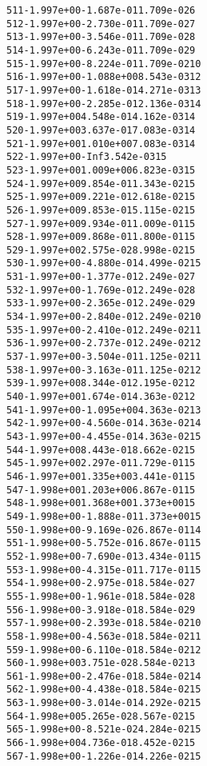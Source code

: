 \begin{alltt}
 511  -1.997e+00  -1.687e-01   1.709e-02    6
 512  -1.997e+00  -2.730e-01   1.709e-02    7
 513  -1.997e+00  -3.546e-01   1.709e-02    8
 514  -1.997e+00  -6.243e-01   1.709e-02    9
 515  -1.997e+00  -8.224e-01   1.709e-02   10
 516  -1.997e+00  -1.088e+00   8.543e-03   12
 517  -1.997e+00  -1.618e-01   4.271e-03   13
 518  -1.997e+00  -2.285e-01   2.136e-03   14
 519  -1.997e+00   4.548e-01   4.162e-03   14
 520  -1.997e+00   3.637e-01   7.083e-03   14
 521  -1.997e+00   1.010e+00   7.083e-03   14
 522  -1.997e+00        -Inf   3.542e-03   15
 523  -1.997e+00   1.009e+00   6.823e-03   15
 524  -1.997e+00   9.854e-01   1.343e-02   15
 525  -1.997e+00   9.221e-01   2.618e-02   15
 526  -1.997e+00   9.853e-01   5.115e-02   15
 527  -1.997e+00   9.934e-01   1.009e-01   15
 528  -1.997e+00   9.868e-01   1.800e-01   15
 529  -1.997e+00   2.575e-02   8.998e-02   15
 530  -1.997e+00  -4.880e-01   4.499e-02   15
 531  -1.997e+00  -1.377e-01   2.249e-02    7
 532  -1.997e+00  -1.769e-01   2.249e-02    8
 533  -1.997e+00  -2.365e-01   2.249e-02    9
 534  -1.997e+00  -2.840e-01   2.249e-02   10
 535  -1.997e+00  -2.410e-01   2.249e-02   11
 536  -1.997e+00  -2.737e-01   2.249e-02   12
 537  -1.997e+00  -3.504e-01   1.125e-02   11
 538  -1.997e+00  -3.163e-01   1.125e-02   12
 539  -1.997e+00   8.344e-01   2.195e-02   12
 540  -1.997e+00   1.674e-01   4.363e-02   12
 541  -1.997e+00  -1.095e+00   4.363e-02   13
 542  -1.997e+00  -4.560e-01   4.363e-02   14
 543  -1.997e+00  -4.455e-01   4.363e-02   15
 544  -1.997e+00   8.443e-01   8.662e-02   15
 545  -1.997e+00   2.297e-01   1.729e-01   15
 546  -1.997e+00   1.335e+00   3.441e-01   15
 547  -1.998e+00   1.203e+00   6.867e-01   15
 548  -1.998e+00   1.368e+00   1.373e+00   15
 549  -1.998e+00  -1.888e-01   1.373e+00   15
 550  -1.998e+00  -9.169e-02   6.867e-01   14
 551  -1.998e+00  -5.752e-01   6.867e-01   15
 552  -1.998e+00  -7.690e-01   3.434e-01   15
 553  -1.998e+00  -4.315e-01   1.717e-01   15
 554  -1.998e+00  -2.975e-01   8.584e-02    7
 555  -1.998e+00  -1.961e-01   8.584e-02    8
 556  -1.998e+00  -3.918e-01   8.584e-02    9
 557  -1.998e+00  -2.393e-01   8.584e-02   10
 558  -1.998e+00  -4.563e-01   8.584e-02   11
 559  -1.998e+00  -6.110e-01   8.584e-02   12
 560  -1.998e+00   3.751e-02   8.584e-02   13
 561  -1.998e+00  -2.476e-01   8.584e-02   14
 562  -1.998e+00  -4.438e-01   8.584e-02   15
 563  -1.998e+00  -3.014e-01   4.292e-02   15
 564  -1.998e+00   5.265e-02   8.567e-02   15
 565  -1.998e+00  -8.521e-02   4.284e-02   15
 566  -1.998e+00   4.736e-01   8.452e-02   15
 567  -1.998e+00  -1.226e-01   4.226e-02   15

\end{alltt}
